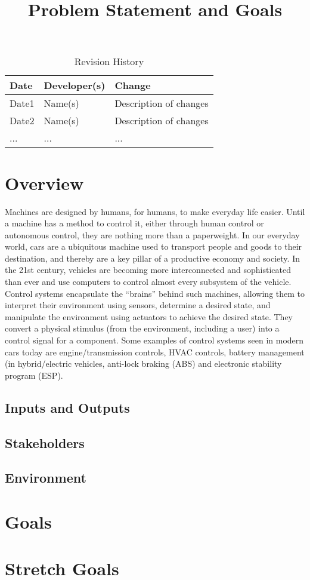 \documentclass{article}
\title{Problem Statement and Goals\\\progname}
\author{\authname}
\date{}
\begin{document}
\maketitle

\begin{table}[hp]
\caption{Revision History} \label{TblRevisionHistory}
\begin{tabularx}{\textwidth}{llX}
\toprule
\textbf{Date} & \textbf{Developer(s)} & \textbf{Change}\\
\midrule
Date1 & Name(s) & Description of changes\\
Date2 & Name(s) & Description of changes\\
... & ... & ...\\
\bottomrule
\end{tabularx}
\end{table}

\section{Overview}
Machines are designed by humans, for humans, 
to make everyday life easier. Until a machine has a 
method to control it, either through human control or 
autonomous control, they are nothing more than a paperweight. 
In our everyday world, cars are a ubiquitous machine used to 
transport people and goods to their destination, and thereby 
are a key pillar of a productive economy and society. In the 
21st century, vehicles are becoming more interconnected and 
sophisticated than ever and use computers to control almost 
every subsystem of the vehicle. Control systems encapsulate 
the “brains” behind such machines, allowing them to interpret 
their environment using sensors, determine a desired state, and 
manipulate the environment using actuators to achieve the 
desired state. They convert a physical stimulus (from the 
environment, including a user) into a control signal for a 
component. Some examples of control systems seen in modern 
cars today are engine/transmission controls, HVAC controls, 
battery management (in hybrid/electric vehicles, anti-lock 
braking (ABS) and electronic stability program (ESP).

\subsection{Inputs and Outputs}


\subsection{Stakeholders}

\subsection{Environment}


\section{Goals}

\section{Stretch Goals}
\end{document}
